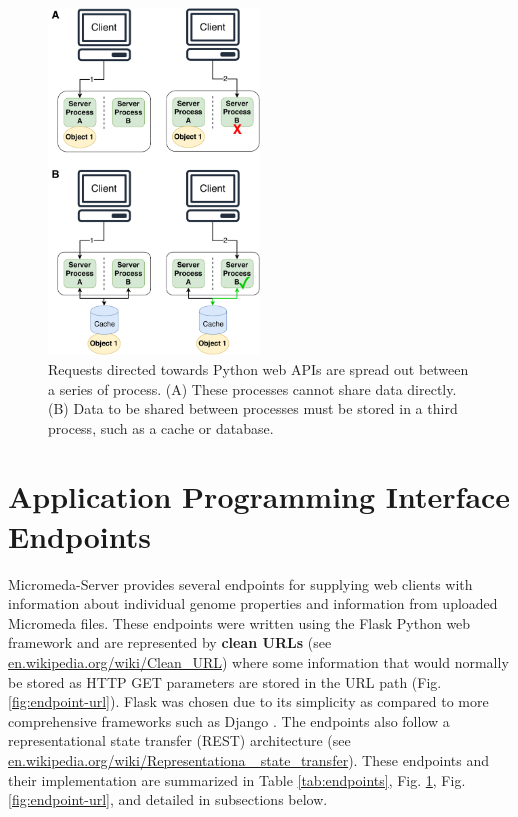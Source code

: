 \begin{figure}[!ht]
  \centering
	\includegraphics[width=0.50\textwidth]{media/Client-Processing.pdf}
	 \caption{Requests directed towards Python web APIs are spread out between a series of process. (A) These processes cannot share data directly. (B) Data to be shared between processes must be stored in a third process, such as a cache or database.}
	 \label{fig:client-processing}
\end{figure}

\section{Application Programming Interface Endpoints} \label{endpoints}

Micromeda-Server provides several endpoints for supplying web clients with information about individual genome properties and information from uploaded Micromeda files. These endpoints were written using the Flask Python web framework \cite{grinberg2018flask} and are represented by \textbf{clean URLs} (see \href{en.wikipedia.org/wiki/Clean\_URL}{en.wikipedia.org/wiki/Clean\_URL}) where some information that would normally be stored as HTTP GET parameters are stored in the URL path (Fig. \ref{fig:endpoint-url}). Flask was chosen due to its simplicity as compared to more comprehensive frameworks such as Django \cite{holovaty2009definitive}. The endpoints also follow a representational state transfer (REST) architecture \cite{fielding2000representational} (see \href{en.wikipedia.org/wiki/Representational\_state\_transfer}{en.wikipedia.org/wiki/Representationa \_state\_transfer}). These endpoints and their implementation are summarized in Table \ref{tab:endpoints}, Fig. \ref{endpoints}, Fig. \ref{fig:endpoint-url}, and detailed in subsections below.

